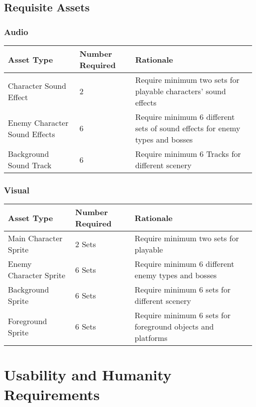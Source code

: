 \documentclass{article}
\begin{document}
	\subsection{Requisite Assets}
	\subsubsection{Audio}
	\begin{table}[H]
		\begin{tabular}{|l|l|l|}
			\hline
			Asset Type & Number Required & Rationale\\ \hline
			Character Sound Effect & 2  &\multicolumn{1}{m{0.45\textwidth}|}{Require minimum two sets for playable characters' sound effects} \\ \hline
			Enemy Character Sound Effects & 6  &\multicolumn{1}{m{0.45\textwidth}|}{Require minimum 6 different sets of sound effects for enemy types and bosses}\\ \hline
			Background Sound Track & 6  &\multicolumn{1}{m{0.45\textwidth}|}{Require minimum 6 Tracks for different scenery} \\ \hline
		\end{tabular}
	\end{table}
	\subsubsection{Visual}
	\begin{table}[H]
		\begin{tabular}{|l|l|l|}
			\hline
			Asset Type & Number Required & Rationale\\ \hline
			Main Character Sprite & 2 Sets &\multicolumn{1}{m{0.5\textwidth}|}{Require minimum two sets for playable } \\ \hline
			Enemy Character Sprite & 6 Sets &\multicolumn{1}{m{0.5\textwidth}|}{ Require minimum 6 different enemy types and bosses}\\ \hline
			Background Sprite & 6 Sets &\multicolumn{1}{m{0.5\textwidth}|}{ Require minimum 6 sets for different scenery}\\ \hline
			Foreground Sprite & 6 Sets &\multicolumn{1}{m{0.5\textwidth}|}{ Require minimum 6 sets for foreground objects and platforms}\\ \hline
		\end{tabular}
	\end{table}


	\section{Usability and Humanity Requirements}
\end{document}
